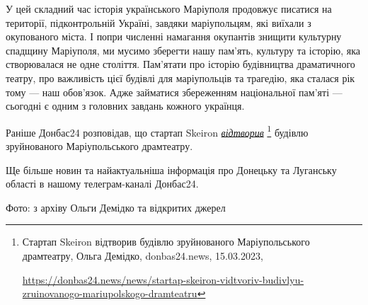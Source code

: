 
У цей складний час історія українського Маріуполя продовжує писатися на
території, підконтрольній Україні, завдяки маріупольцям, які виїхали з
окупованого міста. І попри численні намагання окупантів знищити культурну
спадщину Маріуполя, ми мусимо зберегти нашу пам'ять, культуру та історію, яка
створювалася не одне століття. Пам'ятати про історію будівництва драматичного
театру, про важливість цієї будівлі для маріупольців та трагедію, яка сталася
рік тому — наш обов'язок. Адже займатися збереженням національної пам'яті —
сьогодні є одним з головних завдань кожного українця.

Раніше Донбас24 розповідав, що стартап Skeiron \href{https://donbas24.news/news/startap-skeiron-vidtvoriv-budivlyu-zruinovanogo-mariupolskogo-dramteatru}{\emph{відтворив}}%
\footnote{Стартап Skeiron відтворив будівлю зруйнованого Маріупольського драмтеатру, Ольга Демідко, donbas24.news, 15.03.2023, \par%
\url{https://donbas24.news/news/startap-skeiron-vidtvoriv-budivlyu-zruinovanogo-mariupolskogo-dramteatru}%
} будівлю зруйнованого Маріупольського драмтеатру.

Ще більше новин та найактуальніша інформація про Донецьку та Луганську області
в нашому телеграм-каналі Донбас24.

Фото: з архіву Ольги Демідко та відкритих джерел
